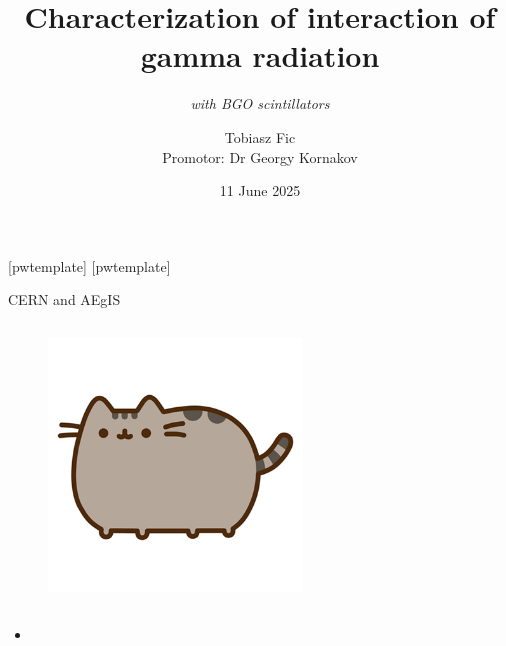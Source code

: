 


\title{Characterization of interaction of gamma radiation }
    \subtitle{\textit{with BGO scintillators}}
\author[T. Fic]{Tobiasz Fic\\ \vspace{5pt} \footnotesize Promotor: Dr Georgy Kornakov}

\date{11 June 2025}



\begin{frame}
    \maketitle
\end{frame}

[pwtemplate]
[pwtemplate]

\begin{columnframe}{CERN and AEgIS}
    \begin{column}{0.5\textwidth}
        \begin{figure}
            \centering
            \includegraphics[width=0.6\textwidth, frame]{images/pusheen.png}
        \end{figure}
    \end{column}
    \begin{column}{0.5\textwidth}
        \begin{itemize}
            \item {}
        \end{itemize}
    \end{column}
\end{columnframe}

